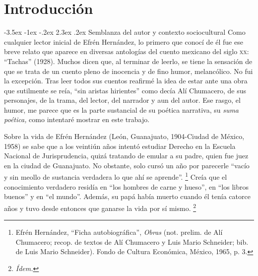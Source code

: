 \documentclass[14pt,twoside,final]{extbook} %
\makeatletter
\let\oldfootnote\footnote
\renewcommand\footnote[1]{%
\oldfootnote{\hspace{1mm}#1}}
\renewcommand\section{\@startsection {section}{1}{\z@}%
                                     {-3.5ex \@plus -1ex \@minus -.2ex}%
                                     {2.3ex \@plus .2ex}%
                                     {\normalfont\large\bfseries\sc}}
\makeatother
\begin{document}
\chapter[\textsc{Introducción}]{Introducción}\label{ch:introduccion}
\BgThispage
\pagestyle{empty}
\thispagestyle{empty}
\pagestyle{fancy}
\fancyhf{} %
\fancyhead[RO,LE]{\thepage}
\renewcommand{\headrulewidth}{0pt}
\section{Semblanza del autor y contexto sociocultural}\label{sec:semblanza-del-autor-y-contexto-sociocultural}
Como cualquier lector inicial de Efrén Hernández, lo primero que conocí de él fue ese breve relato que aparece en diversas antologías del cuento mexicano del siglo \textsc{xx}: ``Tachas'' (1928). Muchos dicen que, al terminar de leerlo, se tiene la sensación de que se trata de un cuento pleno de inocencia y de fino humor, melancólico. No fui la excepción. Tras leer todos sus cuentos reafirmé la idea de estar ante una obra que sutilmente se reía, ``sin aristas hirientes'' como decía Alí Chumacero, de sus personajes, de la trama, del lector, del narrador y aun del autor. Ese rasgo, el humor, me parece que es la parte sustancial de su poética narrativa, su \emph{suma poética,} como intentaré mostrar en este trabajo.

Sobre la vida de Efrén Hernández (León, Guanajuato, 1904-Ciudad de México, 1958) se sabe que a los veintiún años intentó estudiar Derecho en la Escuela Nacional de Jurisprudencia, quizá tratando de emular a su padre, quien fue juez en la ciudad de Guanajuato. No obstante, solo cursó un año por parecerle ``vacío y sin meollo de sustancia verdadera lo que ahí se aprende''.\footnote{Efrén Hernández, ``Ficha autobiográfica'', \emph{Obras} (not. prelim. de Alí Chumacero; recop. de textos de Alí Chumacero y Luis Mario Schneider; bib. de Luis Mario Schneider). Fondo de Cultura Económica, México, 1965, p. 3.} Creía que el conocimiento verdadero residía en ``los hombres de carne y hueso'', en ``los libros buenos'' y en ``el mundo''. Además, su papá había muerto cuando él tenía catorce años y tuvo desde entonces que ganarse la vida por sí mismo.\footnote{\em Ídem.}
\end{document}
